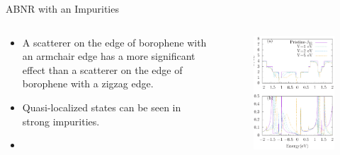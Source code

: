 \documentclass[handout,t]{beamer}
\begin{document}
\begin{frame}{ABNR with an Impurities}
	\begin{columns}[t]
		\begin{column}[t]{0.5\linewidth}
			\begin{itemize}
				\item  A scatterer on the edge of borophene with an armchair edge has a more significant effect than a scatterer on the edge of borophene with a zigzag edge.
				\item Quasi-localized states can be seen in strong impurities.
				\item 		
			\end{itemize}
		\end{column}
		\begin{column}[t]{0.5\linewidth}
			\begin{figure}[ht]
				\raggedleft
				\includegraphics[width=\linewidth]{../figures/armscatter-thesis.eps}
				\label{armscatter}
			\end{figure}
		\end{column}
	\end{columns}
\end{frame}
\end{document}
